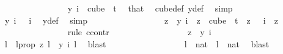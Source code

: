 \begin{isabellebody}
\ \ \ \ \ \ \ \ \ \ \ \ \ \ \isamarkupfalse%
\ {\isachardoublequoteopen}y\ i\ {\isasymin}\ {\isacharparenleft}{\kern0pt}cube\ {}\ t{\isacharparenright}{\kern0pt}{\isachardoublequoteclose}\ \isamarkupfalse%
\ that\ \isamarkupfalse%
\ cube{\isacharunderscore}{\kern0pt}def\ y{\isacharunderscore}{\kern0pt}def\ \isamarkupfalse%
\ simp\isanewline
\ \ \ \ \ \ \ \ \ \ \ \ \ \ \isamarkupfalse%
\ \isamarkupfalse%
\ {\isachardoublequoteopen}y\ i\ {}\ {\isacharequal}{\kern0pt}\ i{\isachardoublequoteclose}\ \isamarkupfalse%
\ y{\isacharunderscore}{\kern0pt}def\ \isamarkupfalse%
\ simp\isanewline
\ \ \ \ \ \ \ \ \ \ \ \ \ \ \isamarkupfalse%
\ \isamarkupfalse%
\ {\isachardoublequoteopen}z\ {\isacharequal}{\kern0pt}\ y\ i{\isachardoublequoteclose}\ \ {\isachardoublequoteopen}z\ {\isasymin}\ cube\ {}\ t{\isachardoublequoteclose}\ \ {\isachardoublequoteopen}z\ {}\ {\isacharequal}{\kern0pt}\ i{\isachardoublequoteclose}\ \ z\isanewline
\ \ \ \ \ \ \ \ \ \ \ \ \ \ \isamarkupfalse%
\ {\isacharparenleft}{\kern0pt}rule\ ccontr{\isacharparenright}{\kern0pt}\isanewline
\ \ \ \ \ \ \ \ \ \ \ \ \ \ \ \ \isamarkupfalse%
\ {\isachardoublequoteopen}z\ {\isasymnoteq}\ y\ i{\isachardoublequoteclose}\ \isanewline
\ \ \ \ \ \ \ \ \ \ \ \ \ \ \ \ \isamarkupfalse%
\ \isamarkupfalse%
\ l\ \ l{\isacharunderscore}{\kern0pt}prop{\isacharcolon}{\kern0pt}\ {\isachardoublequoteopen}z\ l\ {\isasymnoteq}\ y\ i\ l{\isachardoublequoteclose}\ \isamarkupfalse%
\ blast\isanewline
\ \ \ \ \ \ \ \ \ \ \ \ \ \ \ \ \isamarkupfalse%
\ {\isachardoublequoteopen}l\ {\isasymin}\ {\isacharbraceleft}{\kern0pt}{\isachardot}{\kern0pt}{\isachardot}{\kern0pt}{\isacharless}{\kern0pt}{}{\isacharcolon}{\kern0pt}{\isacharcolon}{\kern0pt}nat{\isacharbraceright}{\kern0pt}{\isachardoublequoteclose}\ {\isacharbar}{\kern0pt}\ {\isachardoublequoteopen}l\ {\isasymnotin}\ {\isacharbraceleft}{\kern0pt}{\isachardot}{\kern0pt}{\isachardot}{\kern0pt}{\isacharless}{\kern0pt}{}{\isacharcolon}{\kern0pt}{\isacharcolon}{\kern0pt}nat{\isacharbraceright}{\kern0pt}{\isachardoublequoteclose}\ \isamarkupfalse%
\ blast\isanewline
\ \ \ \ \ \ \ \ \ \ \ \ \ \ \ \ \isamarkupfalse%
\ \isamarkupfalse%

\end{isabellebody}
